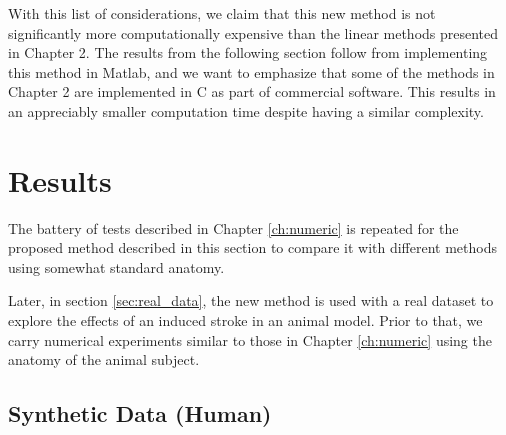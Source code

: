 With this list of considerations, we claim that this new method is not significantly more computationally expensive than the linear methods presented in Chapter 2.
%
The results from the following section follow from implementing this method in Matlab, and we want to emphasize that some of the methods in Chapter 2 are implemented in C as part of commercial software.
%
This results in an appreciably smaller computation time despite having a similar complexity.

\section{Results}

The battery of tests described in Chapter \ref{ch:numeric} is repeated for the proposed method described in this section to compare it with different methods using somewhat standard anatomy.

Later, in section \ref{sec:real_data}, the new method is used with a real dataset to explore the effects of an induced stroke in an animal model.
%
Prior to that, we carry numerical experiments similar to those in Chapter \ref{ch:numeric} using the anatomy of the animal subject.

\subsection{Synthetic Data (Human)}

